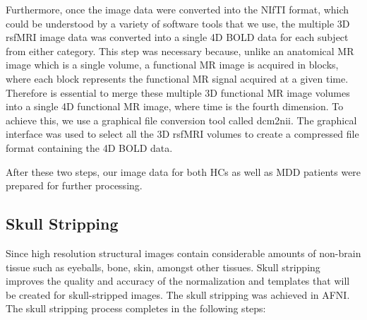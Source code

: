 \documentclass[12pt]{article}
\begin{document}
Furthermore, once the image data were converted into the NIfTI format,
which could be understood by a variety of software tools that we use,
the multiple 3D rsfMRI image data was converted into a single 4D BOLD
data for each subject from either category. This step was necessary
because, unlike an anatomical MR image which is a single volume, a
functional MR image is acquired in blocks, where each block represents
the functional MR signal acquired at a given time. Therefore is
essential to merge these multiple 3D functional MR image volumes into
a single 4D functional MR image, where time is the fourth dimension.
To achieve this, we use a graphical file conversion tool called
dcm2nii. The graphical interface was used to select all the 3D rsfMRI
volumes to create a compressed file format containing the 4D BOLD
data.


After these two steps, our image data for both HCs as well as MDD
patients were prepared for further processing.

\newpage
\subsection{Skull Stripping}

Since high resolution structural images contain considerable amounts
of non-brain tissue such as eyeballs, bone, skin, amongst other
tissues. Skull stripping improves the quality and accuracy of the
normalization and templates that will be created for skull-stripped
images. The skull stripping was achieved in AFNI. The skull stripping
process completes in the following steps:
\end{document}
